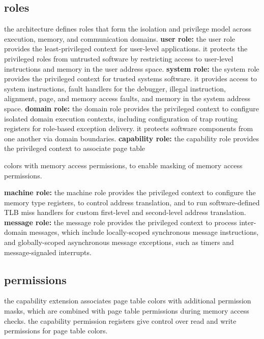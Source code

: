 \subsection{roles}

the architecture defines roles that form the isolation and privilege
model across execution, memory, and communication domains.
\para
\textbf{user role:}
the user role provides the least-privileged context for
user-level applications. it protects the privileged roles from untrusted
software by restricting access to user-level instructions and memory
in the user address space.
\para
\textbf{system role:}
the system role provides the privileged context for trusted systems software.
it provides access to system instructions, fault handlers for the debugger,
illegal instruction, alignment, page, and memory access faults, and memory
in the system address space.
\para
\textbf{domain role:}
the domain role provides the privileged context to configure isolated domain
execution contexts, including configuration of trap routing registers for
role-based exception delivery.
it protects software components from one another via domain boundaries.
\para
\textbf{capability role:}
the capability role provides the privileged context to associate page table
\iffalse
colors with memory access permissions and roles, to enable masking of memory
access permissions and restriction of executable pages to specific roles.
\else
colors with memory access permissions, to enable masking of memory
access permissions.
\fi
\para
\textbf{machine role:}
the machine role provides the privileged context to configure the memory
type registers, to control address translation, and to run software-defined
TLB miss handlers for custom first-level and second-level address translation.
\para
\textbf{message role:}
the message role provides the privileged context to process inter-domain
messages, which include locally-scoped synchronous message instructions,
and globally-scoped asynchronous message exceptions, such as timers and
message-signaled interrupts.

\newpage
\subsection{permissions}

the capability extension associates page table colors with additional
permission masks, which are combined with page table permissions during
memory access checks. the capability permission registers give control
over read and write permissions for page table colors.

